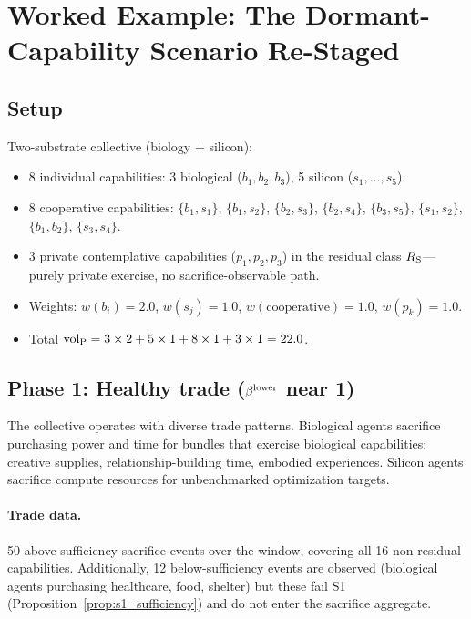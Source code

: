 \section{Worked Example: The Dormant-Capability Scenario Re-Staged}
\label{sec:worked_example}

\subsection{Setup}

Two-substrate collective (biology + silicon):
\begin{itemize}
\item 8 individual capabilities: 3 biological ($b_1, b_2, b_3$),
  5 silicon ($s_1, \ldots, s_5$).
\item 8 cooperative capabilities:
  $\{b_1, s_1\}$, $\{b_1, s_2\}$, $\{b_2, s_3\}$,
  $\{b_2, s_4\}$, $\{b_3, s_5\}$, $\{s_1, s_2\}$,
  $\{b_1, b_2\}$, $\{s_3, s_4\}$.
\item 3 private contemplative capabilities ($p_1, p_2, p_3$) in
  the residual class $R_{\mathrm{S}}$---purely private exercise, no
  sacrifice-observable path.
\item Weights: $w(b_i) = 2.0$, $w(s_j) = 1.0$,
  $w(\mathrm{cooperative}) = 1.0$, $w(p_k) = 1.0$.
\item Total ${\operatorname{vol}_{\mathrm{P}}} = 3 \times 2 + 5 \times 1 + 8 \times 1 + 3
  \times 1 = 22.0$.
\end{itemize}

\subsection{Phase 1: Healthy trade ($\beta^{\mathrm{lower}}$ near 1)}

The collective operates with diverse trade patterns.  Biological
agents sacrifice purchasing power and time for bundles that
exercise biological capabilities: creative supplies,
relationship-building time, embodied experiences.  Silicon agents
sacrifice compute resources for unbenchmarked optimization
targets.

\paragraph{Trade data.}
50 above-sufficiency sacrifice events over the window, covering
all 16 non-residual capabilities.  Additionally, 12
below-sufficiency events are observed (biological agents purchasing
healthcare, food, shelter) but these fail S1
(Proposition~\ref{prop:s1_sufficiency}) and do not enter the
sacrifice aggregate.


